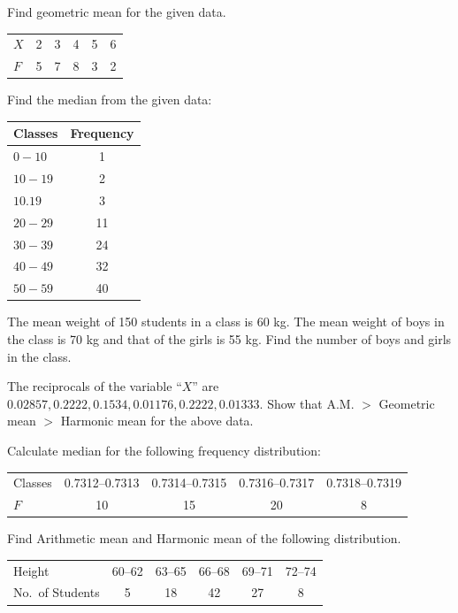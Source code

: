 \documentclass[11pt,a4paper]{article}
\begin{document}
\begin{longlist}
\item Find geometric mean for the given data.
\begin{center}
\begin{tabular}{l|ccccc}
$X$ & 2 & 3 & 4 & 5 & 6 \\
$F$ & 5 & 7 & 8 & 3 & 2
\end{tabular}
\end{center}

\item Find the median from the given data:
\begin{center}
\begin{tabular}{lc}
Classes & Frequency \\
\hline
$0-10$ & 1 \\
$10-19$ & 2 \\
$10.19$ & 3 \\
$20-29$ & 11 \\
$30-39$ & 24 \\
$40-49$ & 32 \\
$50-59$ & 40
\end{tabular}
\end{center}

\item The mean weight of 150 students in a class is 60 kg. The mean weight of boys in the class is 70 kg and that of the girls is 55 kg. Find the number of boys and girls in the class.

\item The reciprocals of the variable ``$X$'' are $0.02857, 0.2222, 0.1534, 0.01176, 0.2222, 0.01333$. Show that A.M. $>$ Geometric mean $>$ Harmonic mean for the above data.

\item Calculate median for the following frequency distribution:
\begin{center}
\begin{tabular}{l|cccc}
Classes & 0.7312--0.7313 & 0.7314--0.7315 & 0.7316--0.7317 & 0.7318--0.7319 \\
$F$ & 10 & 15 & 20 & 8
\end{tabular}
\end{center}

\item Find Arithmetic mean and Harmonic mean of the following distribution.
\begin{center}
\begin{tabular}{l|ccccc}
Height & 60--62 & 63--65 & 66--68 & 69--71 & 72--74 \\
No.\ of Students & 5 & 18 & 42 & 27 & 8
\end{tabular}
\end{center}


\end{longlist}
\end{document}
